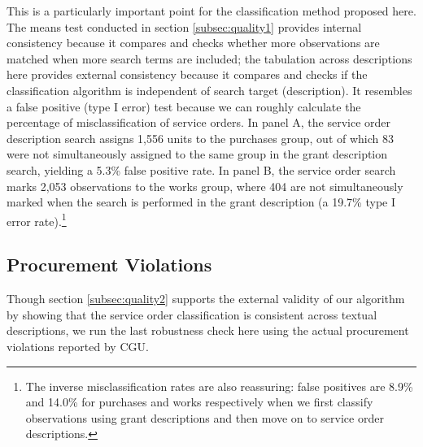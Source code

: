 \documentclass[11pt]{article}
\begin{document}
This is a particularly important point for the classification method proposed here. The means test conducted in section \ref{subsec:quality1} provides internal consistency because it compares and checks whether more observations are matched when more search terms are included; the tabulation across descriptions here provides external consistency because it compares and checks if the classification algorithm is independent of search target (description). It resembles a false positive (type I error) test because we can roughly calculate the percentage of misclassification of service orders. In panel A, the service order description search assigns 1,556 units to the purchases group, out of which 83 were not simultaneously assigned to the same group in the grant description search, yielding a 5.3\% false positive rate. In panel B, the service order search marks 2,053 observations to the works group, where 404 are not simultaneously marked when the search is performed in the grant description (a 19.7\% type I error rate).\footnote{The inverse misclassification rates are also reassuring: false positives are 8.9\% and 14.0\% for purchases and works respectively when we first classify observations using grant descriptions and then move on to service order descriptions.}

\subsection{Procurement Violations}\label{subsec:quality3}

Though section \ref{subsec:quality2} supports the external validity of our algorithm by showing that the service order classification is consistent across textual descriptions, we run the last robustness check here using the actual procurement violations reported by CGU.
\end{document}
